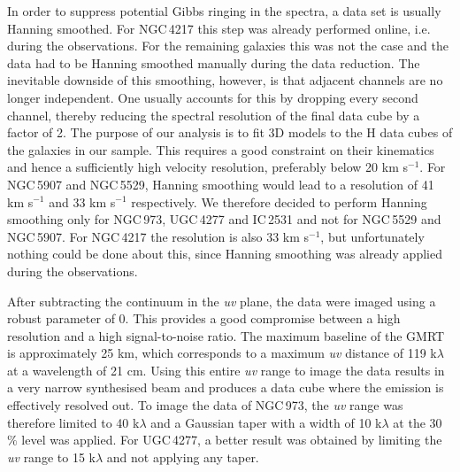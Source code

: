 \documentclass{aa}
\begin{document}
In order to suppress potential Gibbs ringing in the spectra, a data set is usually Hanning smoothed. For NGC\,4217 this step was already performed online, i.e. during the observations. For the remaining galaxies this was not the case and the data had to be Hanning smoothed manually during the data reduction. The inevitable downside of this smoothing, however, is that adjacent channels are no longer independent. One usually accounts for this by dropping every second channel, thereby reducing the spectral resolution of the final data cube by a factor of 2. The purpose of our analysis is to fit 3D models to the H{} data cubes of the galaxies in our sample. This requires a good constraint on their kinematics and hence a sufficiently high velocity resolution, preferably below 20 km s$^{-1}$. For NGC\,5907 and NGC\,5529, Hanning smoothing would lead to a resolution of 41 km s$^{-1}$ and 33 km s$^{-1}$ respectively. We therefore decided to perform Hanning smoothing only for NGC\,973, UGC\,4277 and IC\,2531 and not for NGC\,5529 and NGC\,5907. For NGC\,4217 the resolution is also 33 km s$^{-1}$, but unfortunately nothing could be done about this, since Hanning smoothing was already applied during the observations.
\par
After subtracting the continuum in the {\it uv} plane, the data were imaged using a robust parameter of 0. This provides a good compromise between a high resolution and a high signal-to-noise ratio. The maximum baseline of the GMRT is approximately 25 km, which corresponds to a maximum {\it uv} distance of 119 k$\lambda$ at a wavelength of 21 cm. Using this entire {\it uv} range to image the data results in a very narrow synthesised beam and produces a data cube where the emission is effectively resolved out. To image the data of NGC\,973, the {\it uv} range was therefore limited to 40 k$\lambda$ and a Gaussian taper with a width of 10 k$\lambda$ at the 30 $\%$ level was applied. For UGC\,4277, a better result was obtained by limiting the {\it uv} range to 15 k$\lambda$ and not applying any taper.
\par
\end{document}
